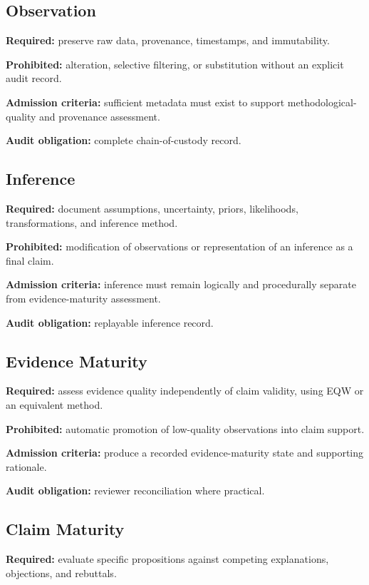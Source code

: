 \documentclass[11pt,a4paper]{article}
\begin{document}
\subsection{Observation}

\textbf{Required:} preserve raw data, provenance, timestamps, and immutability.

\textbf{Prohibited:} alteration, selective filtering, or substitution without an explicit audit record.

\textbf{Admission criteria:} sufficient metadata must exist to support methodological-quality and provenance assessment.

\textbf{Audit obligation:} complete chain-of-custody record.

\subsection{Inference}

\textbf{Required:} document assumptions, uncertainty, priors, likelihoods, transformations, and inference method.

\textbf{Prohibited:} modification of observations or representation of an inference as a final claim.

\textbf{Admission criteria:} inference must remain logically and procedurally separate from evidence-maturity assessment.

\textbf{Audit obligation:} replayable inference record.

\subsection{Evidence Maturity}

\textbf{Required:} assess evidence quality independently of claim validity, using EQW or an equivalent method.

\textbf{Prohibited:} automatic promotion of low-quality observations into claim support.

\textbf{Admission criteria:} produce a recorded evidence-maturity state and supporting rationale.

\textbf{Audit obligation:} reviewer reconciliation where practical.

\subsection{Claim Maturity}

\textbf{Required:} evaluate specific propositions against competing explanations, objections, and rebuttals.
\end{document}
